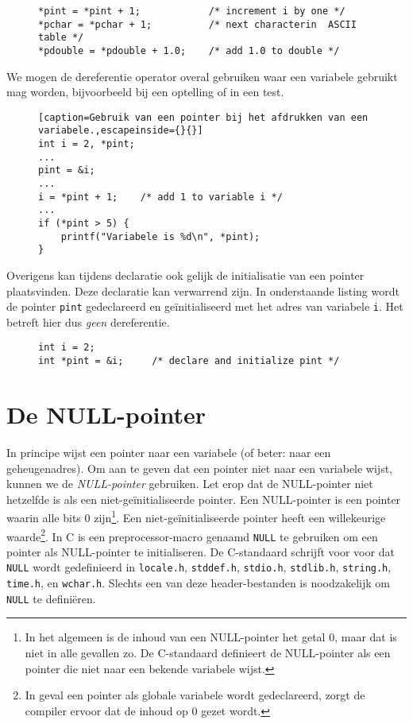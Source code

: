 \begin{figure}[!ht]
\begin{lstlisting}[caption=Gebruik van een pointer bij een toekenning.]
*pint = *pint + 1;            /* increment i by one */
*pchar = *pchar + 1;          /* next characterin  ASCII table */
*pdouble = *pdouble + 1.0;    /* add 1.0 to double */
\end{lstlisting}
\end{figure}

We mogen de dereferentie operator overal gebruiken waar een variabele gebruikt mag worden, bijvoorbeeld bij een optelling of in een test.

\begin{figure}[!ht]
\begin{lstlisting}[caption=Gebruik van een pointer bij het afdrukken van een variabele.,escapeinside={}{}]
int i = 2, *pint;
...
pint = &i;
...
i = *pint + 1;    /* add 1 to variable i */
...
if (*pint > 5) {
    printf("Variabele is %d\n", *pint);
}
\end{lstlisting}
\end{figure}

Overigens kan tijdens declaratie ook gelijk de initialisatie van een pointer plaatsvinden. Deze declaratie kan verwarrend zijn. In onderstaande listing wordt de pointer \texttt{pint} gedeclareerd en geïnitialiseerd met het adres van variabele \texttt{i}. Het betreft hier dus \textsl{geen} dereferentie.

\begin{figure}[!ht]
\begin{lstlisting}[caption=Declaratie en initialisatie van een pointer.]
int i = 2;
int *pint = &i;     /* declare and initialize pint */
\end{lstlisting}
\end{figure}

\section{De NULL-pointer}
\label{sec:nullpointer}
In principe wijst een pointer naar een variabele (of beter: naar een geheugenadres). Om aan te geven dat een pointer niet naar een variabele wijst, kunnen we de \textsl{NULL-pointer} gebruiken. Let erop dat de NULL-pointer niet hetzelfde is als een niet-geïnitialiseerde pointer. Een NULL-pointer is een pointer waarin alle bits 0 zijn\footnote{In het algemeen is de inhoud van een NULL-pointer het getal 0, maar dat is niet in alle gevallen zo. De C-standaard definieert de NULL-pointer als een pointer die niet naar een bekende variabele wijst.}. Een niet-geïnitialiseerde pointer heeft een willekeurige waarde\footnote{In geval een pointer als globale variabele wordt gedeclareerd, zorgt de compiler ervoor dat de inhoud op 0 gezet wordt.}. In C is een preprocessor-macro genaamd \texttt{NULL} te gebruiken om een pointer als NULL-pointer te initialiseren. De C-standaard schrijft voor voor dat \texttt{NULL} wordt gedefinieerd in \texttt{locale.h}, \texttt{stddef.h}, \texttt{stdio.h}, \texttt{stdlib.h}, \texttt{string.h}, \texttt{time.h}, en \texttt{wchar.h}. Slechts een van deze header-bestanden is noodzakelijk om \texttt{NULL} te definiëren.

